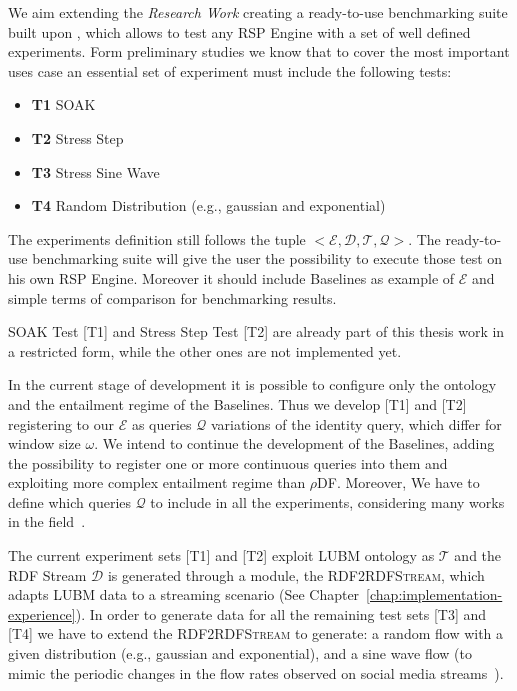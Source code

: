 \noindent We aim extending the \textit{Research Work} creating a ready-to-use benchmarking suite built upon \namens, which allows to test any RSP Engine with a set of well defined experiments. Form preliminary studies we know that to cover the most important uses case an essential set of experiment must include the following tests:
\begin{itemize}
\item \textbf{T1} SOAK
\item \textbf{T2} Stress Step
\item \textbf{T3} Stress Sine Wave
\item \textbf{T4} Random Distribution (e.g., gaussian and exponential)
\end{itemize}

The experiments definition still follows the tuple $<\mathcal{E},\mathcal{D},\mathcal{T},\mathcal{Q}>$. The ready-to-use benchmarking suite will give the user the possibility to execute those test on his own RSP Engine. Moreover it should include \name Baselines as example of $\mathcal{E}$ and simple terms of comparison for benchmarking results.

SOAK Test [T1] and Stress Step Test [T2] are already part of this thesis work in a restricted form, while the other ones are not implemented yet. 

In the current stage of development it is possible to configure only the ontology and the entailment regime of the Baselines. Thus we develop [T1] and [T2] registering to our $\mathcal{E}$ as queries $\mathcal{Q}$ variations of the identity query, which differ for window size $\omega$. We intend to continue the development of the Baselines, adding the possibility to register one or more continuous queries into them and exploiting more complex entailment regime than $\rho$DF. Moreover, We have to define which queries $\mathcal{Q}$ to include in all the experiments, considering many works in the field~\cite{DBLP:conf/esws/ScharrenbachUMVB13, Zhang2012, LePhuoc2012c, DBLP:conf/semweb/DellAglioCBCV13}.

The current experiment sets [T1] and [T2] exploit LUBM ontology as $\mathcal{T}$ and the RDF Stream $\mathcal{D}$ is generated through a module, the \textsc{RDF2RDFStream}, which adapts LUBM data to a streaming scenario (See Chapter~\ref{chap:implementation-experience}). In order to generate data for all the remaining test sets [T3] and [T4] we have to extend the \textsc{RDF2RDFStream} to generate: a random flow with a given distribution (e.g., gaussian and exponential), and a sine wave flow (to mimic the periodic changes in the flow rates observed on social media streams~\cite{DBLP:conf/semweb/BalduiniVDTPC13}).

